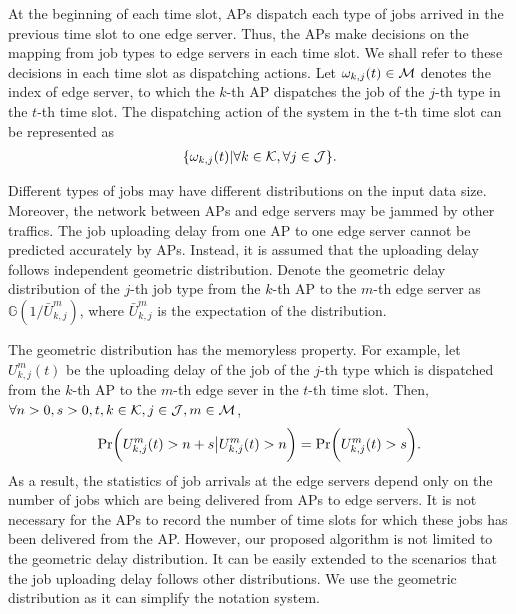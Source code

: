 At the beginning of each time slot, APs dispatch each type of jobs arrived in the previous time slot to one edge server. Thus, the APs make decisions on the mapping from job types to edge servers in each time slot. We shall refer to these decisions in each time slot as dispatching actions. Let $\omega_{k,j}(t)\in\mathcal{M}$ denotes the index of edge server, to which the $k$-th AP dispatches the job of the $j$-th type in the $t$-th time slot. The dispatching action of the system in the t-th time slot can be represented as
\begin{align*}
    \{ \omega_{k,j}(t)|\forall k\in\mathcal{K},\forall j\in\mathcal{J} \}.
\end{align*}

Different types of jobs may have different distributions on the input data size. Moreover, the network between APs and edge servers may be jammed by other traffics. The job uploading delay from one AP to one edge server cannot be predicted accurately by APs. Instead, it is assumed that the uploading delay follows independent geometric distribution. Denote the geometric delay distribution of the $j$-th job type from the $k$-th AP to the $m$-th edge server as $\mathbb G\left(1/\bar{U}_{k,j}^{m}\right)$, where $\bar{U}_{k,j}^{m}$ is the expectation of the distribution. 

\begin{remark}
    The  geometric distribution has the memoryless property. For example, let $U^m_{k,j}(t)$ be the uploading delay of the job of the $j$-th type which is dispatched from the $k$-th AP to the $m$-th edge sever in the $t$-th time slot. Then,
    $\forall n>0, s>0, t, k\in\mathcal{K},j\in\mathcal{J},m\in\mathcal{M}$, 
    \begin{align*}
        \Pr\Paren{
            {U}_{k,j}^{m}(t)> n+s\big|{U}_{k,j}^{m}(t)>n
        } = 
        \Pr\Paren{{U}_{k,j}^{m}(t)>s}.
    \end{align*}
    As a result, the statistics of job arrivals at the edge servers depend only on the number of jobs which are being delivered from APs to edge servers. It is not necessary for the APs to record the number of time slots for which these jobs has been delivered from the AP.
    However, our proposed algorithm is not limited to the geometric delay distribution. It can be easily extended to the scenarios that the job uploading delay follows other distributions. We use the geometric distribution as it can simplify the notation system.
\end{remark}

